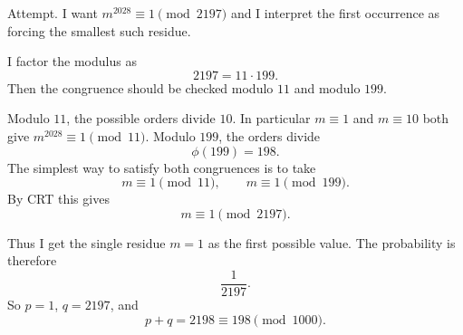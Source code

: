 Attempt.  I want \(m^{2028}\equiv 1\pmod {2197}\) and I interpret the first occurrence as forcing the smallest such residue.

I factor the modulus as
\[
2197=11\cdot 199.
\]
Then the congruence should be checked modulo \(11\) and modulo \(199\).

Modulo \(11\), the possible orders divide \(10\).  In particular \(m\equiv 1\) and \(m\equiv 10\) both give \(m^{2028}\equiv 1\pmod {11}\).  Modulo \(199\), the orders divide
\[
\phi(199)=198.
\]
The simplest way to satisfy both congruences is to take
\[
m\equiv 1\pmod {11},\qquad m\equiv 1\pmod {199}.
\]
By CRT this gives
\[
m\equiv 1\pmod {2197}.
\]

Thus I get the single residue \(m=1\) as the first possible value.  The probability is therefore
\[
\frac1{2197}.
\]
So \(p=1\), \(q=2197\), and
\[
p+q=2198\equiv \boxed{198}\pmod {1000}.
\]
